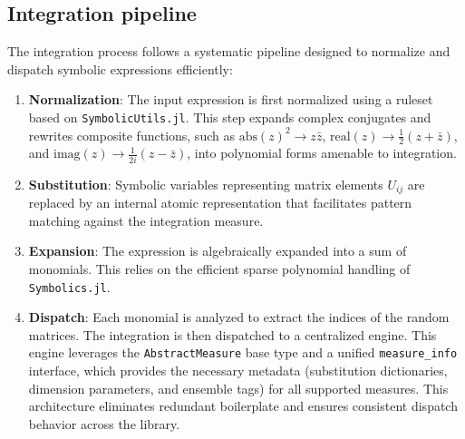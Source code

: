 \documentclass[manuscript,screen]{acmart}
\begin{document}
\subsection{Integration pipeline}
The integration process follows a systematic pipeline designed to normalize and
dispatch symbolic expressions efficiently:
\begin{enumerate}
    \item \textbf{Normalization}: The input expression is first normalized using a ruleset
    based on \texttt{SymbolicUtils.jl}. This step expands complex conjugates and rewrites
    composite functions, such as $\mathrm{abs}(z)^2 \to z \bar{z}$, $\mathrm{real}(z) \to \frac{1}{2}(z +
    \bar{z})$, and $\mathrm{imag}(z) \to \frac{1}{2i}(z - \bar{z})$, into polynomial forms
    amenable to integration.
    \item \textbf{Substitution}: Symbolic variables representing matrix elements
    $U_{ij}$ are replaced by an internal atomic representation that facilitates
    pattern matching against the integration measure.
    \item \textbf{Expansion}: The expression is algebraically expanded into a sum of monomials.
    This relies on the efficient sparse polynomial handling of
    \texttt{Symbolics.jl}.
    \item \textbf{Dispatch}: Each monomial is analyzed to extract the indices of
    the random matrices. The integration is then dispatched to a centralized
    engine. This engine leverages the \texttt{AbstractMeasure} base type and a
    unified \texttt{measure\_info} interface, which provides the necessary
    metadata (substitution dictionaries, dimension parameters, and ensemble
    tags) for all supported measures. This architecture eliminates redundant
    boilerplate and ensures consistent dispatch behavior across the library.
\end{enumerate}
\end{document}
